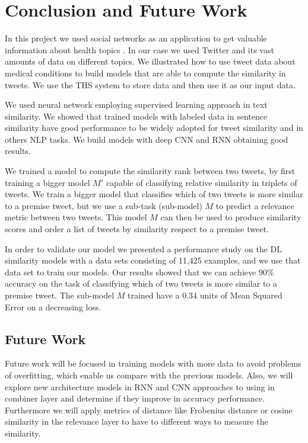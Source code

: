 \documentclass[12pt]{report}
\begin{document}

\chapter{Conclusion and Future Work} \label{chapter 6}
In this project we used social networks as an application to get valuable information about health topics . In our case we used Twitter and its  vast amounts of data on different topics. We illustrated how to use tweet data about medical conditions to build models that are able to compute the similarity in tweets. We use the {THS} system to store data and then use it as our input data.

We used neural network employing supervised learning approach in text similarity. We showed that trained models with labeled data in sentence similarity have good performance to be widely adopted for tweet similarity and in others \ac{NLP} tasks. We build models with deep \ac{CNN} and \ac{RNN}  obtaining good results.

We trained a model to compute the similarity rank between two tweets, by first training a bigger model $M'$ capable of classifying relative similarity in triplets of tweets. We train a bigger model that classifies which of two tweets is more similar to a premise tweet, but we use a sub-task (sub-model) $M$ to predict a relevance metric between  two tweets. This model $M$ can then be used to produce similarity scores and order a list of tweets by similarity respect to a premise tweet.

In order to validate our model we presented a performance study on the DL similarity models with a data sets consisting of 11,425 examples, and we use that data set to train our models. Our results showed that we can achieve 90\% accuracy on the task of classifying which of two tweets is more similar to a premise tweet. The sub-model $M$ trained have a 0.34 units of Mean Squared Error on a decreasing loss.

\section{Future Work}
Future work will be focused in training models with more data to avoid problems of overfitting, which enable us compare with the previous models. Also, we will explore new architecture models in {RNN} and {CNN} approaches to using in combiner layer and determine if they improve in accuracy performance. 
Furthermore we will apply metrics of distance like Frobenius distance or cosine similarity in the relevance layer to have to different ways to measure the similarity.
\end{document}
